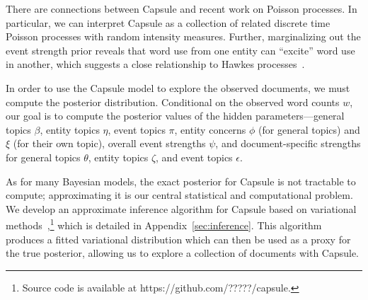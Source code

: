 There are connections between Capsule and recent work on Poisson
processes. In particular, we can interpret Capsule as a collection of
related discrete time Poisson processes with random intensity
measures. Further, marginalizing out the event strength prior reveals
that word use from one entity can ``excite'' word use in another, which
suggests a close relationship to Hawkes processes~\cite{hawkes1971spectra}.

In order to use the Capsule model to explore the observed documents, we must compute the posterior distribution.  Conditional on the observed word counts $w$, our goal is to compute the posterior values of the hidden parameters---general topics $\beta$, entity topics $\eta$, event topics $\pi$, entity concerns $\phi$ (for general topics) and $\xi$ (for their own topic), overall event strengths $\psi$, and document-specific strengths for general topics $\theta$, entity topics $\zeta$, and event topics $\epsilon$.

As for many Bayesian models, the exact posterior for Capsule is not tractable to compute; approximating it is our central statistical and computational problem.  We develop an approximate inference algorithm for Capsule based on variational methods~\cite{jordan1999introduction},\footnote{Source code is available at https://github.com/?????/capsule.} which is detailed in Appendix~\ref{sec:inference}. This algorithm produces a fitted variational distribution which can then be used as a proxy for the true posterior, allowing us to explore a collection of documents with Capsule.  




